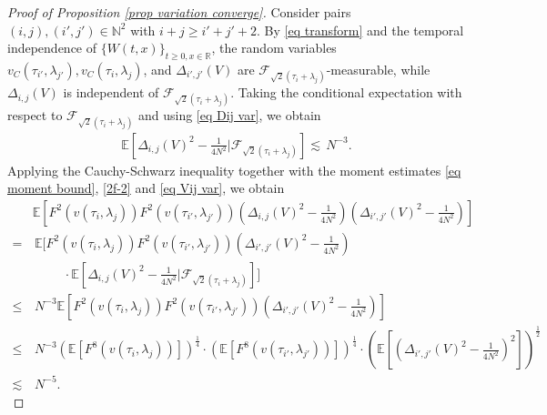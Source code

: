 \documentclass[11pt,reqno]{amsart}
\numberwithin{equation}{section}
\newcommand{\1}{{\bf 1}}
\newcommand{\2}{{\bf 2}}
\begin{document}
\begin{proof}[Proof of Proposition \ref{prop variation converge}]
      Consider   pairs $(i, j), (i', j')\in \mathbb N^2$  with  $i+j\ge i'+j'+2$. By \eqref{eq transform} and  the temporal independence of  $\{W(t, x)\}_{t\ge0, x\in\mathbb R}$,    the random variables    $v_C(\tau_{i'}, \lambda_{j'}), v_C(\tau_i, \lambda_j)$,  and $\Delta_{i',j'}(V)$ are  $\mathcal F_{\sqrt{2}(\tau_i+\lambda_j)}$-measurable,   while  $\Delta_{i,j}(V)$   is independent of   $\mathcal F_{\sqrt{2}(\tau_i+\lambda_j)}$. 
              Taking the conditional expectation with respect to    $\mathcal F_{\sqrt{2}(\tau_i+\lambda_j)}$ and using  \eqref{eq Dij var}, we obtain
      \begin{align}\label{eq Vij var}
      \mathbb E\left[    \Delta_{i,j}(V)^2   -\frac{1}{4N^2} \Big|\mathcal F_{\sqrt{2}(\tau_i+\lambda_j)}\right]  \lesssim \,  N^{-3}.
      \end{align}
      Applying the Cauchy-Schwarz inequality together with the moment estimates  \eqref{eq moment bound},  \eqref{2f-2} and \eqref{eq Vij var}, we obtain 
       \begin{align*}
  & \mathbb E\left[   F^2(v(\tau_i, \lambda_j) )  F^2(v(\tau_{i'}, \lambda_{j'})) \left(   \Delta_{i,j}(V)^2   -\frac{1}{4N^2}\right)   \left(    \Delta_{i',j'}(V)^2   -\frac{1}{4N^2}\right) \right]\\
   =&\, \mathbb E\Bigg[   F^2(v(\tau_i, \lambda_j) )  F^2(v(\tau_{i'}, \lambda_{j'}))     \left(    \Delta_{i',j'}(V)^2   - \frac{1}{4N^2}\right) \\
   &   \ \ \ \ \ \  \ \ \ \ \     \cdot  \mathbb E\left[\Delta_{i,j}(V)^2   -\frac{1}{4N^2}\Big |\mathcal F_{\sqrt{2}(\tau_i+\lambda_j)}\right] \Bigg]\\
   \le &   \,    N^{-3}  \mathbb E\left[   F^2(v(\tau_i, \lambda_j) )  F^2(v(\tau_{i'}, \lambda_{j'}))    \left(    \Delta_{i',j'}(V)^2   -\frac{1}{4N^2}\right) \right]\\
  \le &\,  N^{-3} \left(\mathbb E\left[   F^8(v(\tau_i, \lambda_j) )  \right]\right)^{\frac14}  \cdot \left(\mathbb E\left[  F^8(v(\tau_{i'}, \lambda_{j'})) \right] \right)^{\frac14} \cdot \left(\mathbb E\left[ \left(\Delta_{i',j'}(V)^2   -\frac{1}{4N^2}\right)^2\right]\right)^{\frac12}    \\
  \lesssim  &\,   N^{-5}.
     \end{align*}
     
            
             

\end{proof}
\end{document}
